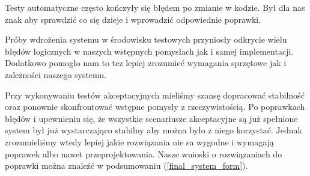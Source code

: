 \documentclass[../analiza-rozwiazania.tex]{subfiles}
\begin{document}
Testy automatyczne często kończyły się błędem po zmianie w kodzie.
Był dla nas znak aby sprawdzić co się dzieje i wprowadzić odpowiednie poprawki.

Próby wdrożenia systemu w środowisku testowych przyniosły odkrycie wielu błędów logicznych w naszych wstępnych pomysłach jak i samej implementacji.
Dodatkowo pomogło nam to tez lepiej zrozumieć wymagania sprzętowe jak i zależności naszego systemu.

Przy wykonywaniu testów akceptacyjnych mieliśmy szansę dopracować stabilność oraz ponownie skonfrontować wstępne pomysły z rzeczywistością.
Po poprawkach błędów i upewnieniu się, że wszystkie scenariusze akceptacyjne są już spełnione system był już wystarczająco stabilny aby można było z niego korzystać.
Jednak zrozumieliśmy wtedy lepiej jakie rozwiązania nie sa wygodne i wymagają poprawek albo nawet przeprojektowania.
Nasze wnioski o rozwiązaniach do poprawki można znaleźć w podsumowaniu (\ref{final_system_form}).
\end{document}
